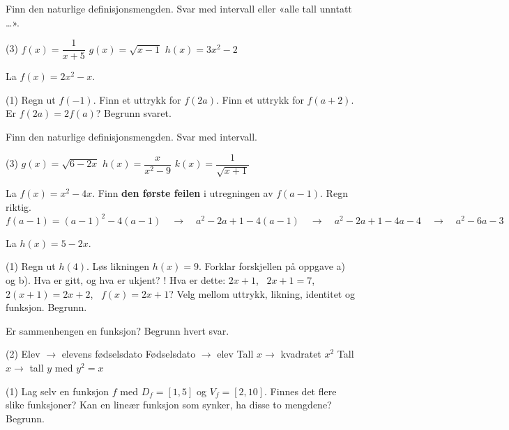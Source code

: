 Finn den naturlige definisjonsmengden. Svar med intervall eller «alle tall unntatt …».
\begin{tasks}(3)
  \task $f(x) = \dfrac{1}{x+5}$
  \task $g(x) = \sqrt{x - 1}$
  \task $h(x) = 3x^2 - 2$
\end{tasks}


La $f(x) = 2x^2 - x$.
\begin{tasks}(1)
  \task Regn ut $f(-1)$.
  \task Finn et uttrykk for $f(2a)$.
  \task Finn et uttrykk for $f(a+2)$.
  \task Er $f(2a) = 2f(a)$? Begrunn svaret.
\end{tasks}

Finn den naturlige definisjonsmengden. Svar med intervall.
\begin{tasks}(3)
  \task $g(x) = \sqrt{6 - 2x}$
  \task $h(x) = \dfrac{x}{x^2 - 9}$
  \task $k(x) = \dfrac{1}{\sqrt{x+1}}$
\end{tasks}

La $f(x) = x^2 - 4x$. Finn \textbf{den første feilen} i utregningen av $f(a-1)$. Regn riktig.
\[ f(a-1) = (a-1)^2 - 4(a-1) \quad\longrightarrow\quad a^2 - 2a + 1 - 4(a-1) \quad\longrightarrow\quad a^2 - 2a + 1 - 4a - 4 \quad\longrightarrow\quad a^2 - 6a - 3 \]

La $h(x) = 5 - 2x$.
\begin{tasks}(1)
  \task Regn ut $h(4)$.
  \task Løs likningen $h(x) = 9$.
  \task Forklar forskjellen på oppgave a) og b). Hva er gitt, og hva er ukjent?
  \task! Hva er dette: $2x+1$, \ $2x+1=7$, \ $2(x+1)=2x+2$, \ $f(x)=2x+1$? Velg mellom uttrykk, likning, identitet og funksjon. Begrunn.
\end{tasks}


Er sammenhengen en funksjon? Begrunn hvert svar.
\begin{tasks}(2)
  \task Elev $\to$ elevens fødselsdato
  \task Fødselsdato $\to$ elev
  \task Tall $x \to$ kvadratet $x^2$
  \task Tall $x \to$ tall $y$ med $y^2 = x$
\end{tasks}

\begin{tasks}(1)
  \task Lag selv en funksjon $f$ med $D_f = [1, 5]$ og $V_f = [2, 10]$.
  \task Finnes det flere slike funksjoner?
  \task Kan en lineær funksjon som synker, ha disse to mengdene? Begrunn.
\end{tasks}

